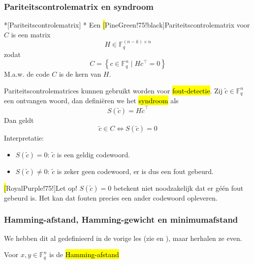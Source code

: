 \newpage
\subsubsection{Pariteitscontrolematrix en syndroom}

\begin{nicedefinition}*[Pariteitscontrolematrix]
    \nextpart[]*
    Een \hl[PineGreen!75!black]{Pariteitscontrolematrix} voor $C$ is een matrix
    \begin{equation*}
        H \in \mathbb{F}_q^{(n-k) \times n}
    \end{equation*}
    zodat
    \begin{equation*}
        C = \left\{ c \in \mathbb{F}_q^n \mid Hc^\top = 0 \right\}
    \end{equation*}
    M.a.w. de code $C$ is de kern van $H$.
\end{nicedefinition}

Pariteitscontrolematrices kunnen gebruikt worden voor \hl{fout-detectie}. Zij $\tilde{c} \in \mathbb{F}_q^n$ een ontvangen woord, dan definiëren we het \hl{syndroom} als
\begin{equation*}
    S(\tilde{c}) = H\tilde{c}^\top
\end{equation*}
Dan geldt
\begin{equation*}
    \tilde{c} \in C \iff S(\tilde{c}) = 0
\end{equation*}
Interpretatie:
\begin{itemize}
    \item $S(\tilde{c}) = 0$: $\tilde{c}$ is een geldig codewoord.
    \item $S(\tilde{c}) \neq 0$: $\tilde{c}$ is zeker geen codewoord, er is dus een fout gebeurd.
\end{itemize}
\begin{barbox}[RoyalPurple!75][gray!3]
    \hl[RoyalPurple!75!]{Let op!} $S(\tilde{c}) = 0$ betekent niet noodzakelijk dat er géén fout gebeurd is. Het kan dat fouten precies een ander codewoord opleveren.
\end{barbox}

\subsubsection{Hamming-afstand, Hamming-gewicht en minimumafstand}

We hebben dit al gedefinieerd in de vorige les (zie  en ), maar herhalen ze even.

Voor $x,y \in \mathbb{F}_q^n$ is de \hl{Hamming-afstand}

